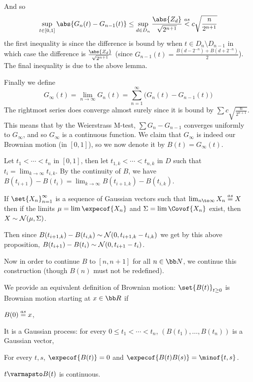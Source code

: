 And so
$$ \sup_{t\in[0,1]}\abs{G_n(t)-G_{n-1}(t)} \leq \sup_{d\in D_n}\frac{\abs{Z_d}}{\sqrt{2^{n+1}}} \buildrel as\over< c\sqrt{\frac n{2^{n+1}}} $$
the first inequality is since the difference is bound by when $t\in D_n\setminus D_{n-1}$ in which case the difference is $\frac{\abs{Z_d}}{\sqrt{2^{n+1}}}$ (since
$G_{n-1}(t)=\frac{B(d-2^{-n})+B(d+2^{-n})}2$).
The final inequality is due to the above lemma.

Finally we define
$$ G_\infty(t) = \lim_{n\to\infty}G_n(t) = \sum_{n=1}^\infty\bigl(G_n(t) - G_{n-1}(t)\bigr) $$
The rightmost series does converge almost surely since it is bound by $\sum c\sqrt{\frac n{2^{n+1}}}$.
This means that by the Weierstrass M-test, $\sum G_n-G_{n-1}$ converges uniformly to $G_\infty$, and so $G_\infty$ is a continuous function.
We claim that $G_\infty$ is indeed our Brownian motion (in $[0,1]$), so we now denote it by $B(t)=G_\infty(t)$.

Let $t_1<\cdots<t_n$ in $[0,1]$, then let $t_{1,k}<\cdots<t_{n,k}$ in $D$ such that $t_i=\lim_{k\to\infty}t_{i,k}$.
By the continuity of $B$, we have $B(t_{i+1})-B(t_i)=\lim_{k\to\infty}B(t_{i+1,k})-B(t_{i,k})$.

\bprop

    If $\set{X_n}_{n=1}^\infty$ is a sequence of Gaussian vectors such that $\lim_{n\to\infty}X_n\buildrel as\over=X$ then if the limits $\mu=\lim\expecof{X_n}$ and $\Sigma=\lim\Covof{X_n}$ exist, then
    $X\sim{\cal N}(\mu,\Sigma)$.

\eprop

Then since $B(t_{i+1,k})-B(t_{i,k})\sim{\cal N}(0,t_{i+1,k}-t_{i,k})$ we get by this above proposition, $B(t_{i+1})-B(t_i)\sim{\cal N}(0,t_{i+1}-t_i)$.

Now in order to continue $B$ to $[n,n+1]$ for all $n\in{\bb N}$, we continue this construction (though $B(n)$ must not be redefined).

\bdefn

    We provide an equivalent definition of Brownian motion: $\set{B(t)}_{t\geq0}$ is Brownian motion starting at $x\in{\bb R}$ if
    \benum
        \item $B(0)\buildrel as\over=x$,
        \item It is a Gaussian process: for every $0\leq t_1<\cdots<t_n$, $(B(t_1),\dots,B(t_n))$ is a Gaussian vector,
        \item For every $t,s$, $\expecof{B(t)}=0$ and $\expecof{B(t)B(s)}=\minof{t,s}$.
        \item $t\varmapsto B(t)$ is continuous.
    \eenum

